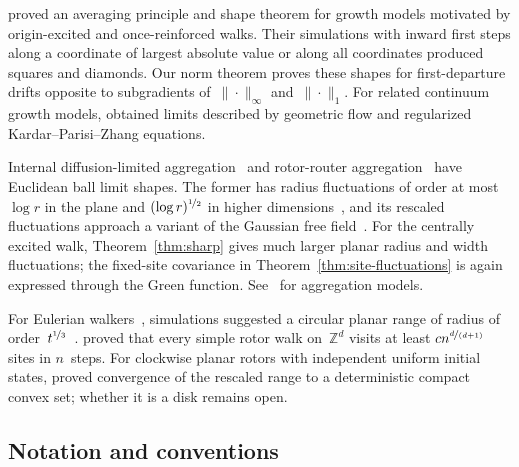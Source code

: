 \documentclass[11pt]{amsart}
\theoremstyle{plain}
\theoremstyle{definition}
\newcommand{\Z}{\mathbb Z}
\newcommand{\nf}{\nicefrac}
\numberwithin{equation}{section}
\begin{document}
\citet{DemboGroismanHuangSidoravicius2021} proved an averaging principle and shape theorem for growth models motivated by origin-excited and once-reinforced walks. Their simulations with inward first steps along a coordinate of largest absolute value or along all coordinates produced squares and diamonds. Our norm theorem proves these shapes for first-departure drifts opposite to subgradients of~$\|\cdot\|_\infty$ and~$\|\cdot\|_1$. For related continuum growth models, \citet*{DemboYang2025Flow,DemboYang2025KPZ} obtained limits described by geometric flow and regularized Kardar--Parisi--Zhang equations.

Internal diffusion-limited aggregation~\citep{LawlerBramsonGriffeath1992} and rotor-router aggregation~\citep{LevinePeres2009} have Euclidean ball limit shapes. The former has radius fluctuations of order at most $\log r$ in the plane and $(\log r)^{\nf12}$ in higher dimensions~\citep{JerisonLevineSheffield2012,JerisonLevineSheffield2013,AsselahGaudilliere2013,AsselahGaudilliere2013Polynomial}, and its rescaled fluctuations approach a variant of the Gaussian free field~\citep{JerisonLevineSheffield2014}. For the centrally excited walk, Theorem~\ref{thm:sharp} gives much larger planar radius and width fluctuations; the fixed-site covariance in Theorem~\ref{thm:site-fluctuations} is again expressed through the Green function. See~\citet*{LevinePeres2017} for aggregation models.

For Eulerian walkers~\citep{PriezzhevDharDharKrishnamurthy1996}, simulations suggested a circular planar range of radius of order~$t^{\nf13}$~\citep{KapriDhar2009}. \citet*{FlorescuLevinePeres2016} proved that every simple rotor walk on~$\Z^d$ visits at least $cn^{\nf{d}{(d+1)}}$ sites in $n$~steps. For clockwise planar rotors with independent uniform initial states, \citet*{BouRabeePeres2026} proved convergence of the rescaled range to a deterministic compact convex set; whether it is a disk remains open.

\subsection{Notation and conventions}\label{sec:notation}
\end{document}
